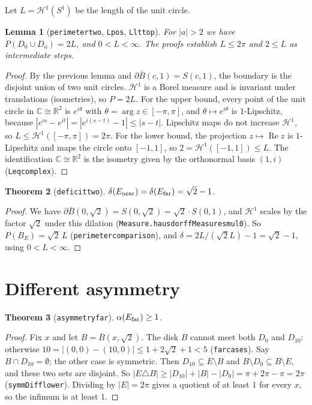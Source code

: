 \documentclass[11pt]{article}
\newtheorem{theorem}{Theorem}
\newtheorem{lemma}[theorem]{Lemma}
\theoremstyle{definition}
\theoremstyle{remark}
\renewcommand{\_}{\oldus\allowbreak}
\newcommand{\R}{\mathbb{R}}
\newcommand{\Hm}{\mathcal{H}^1}
\begin{document}
Let $L=\Hm(S^1)$ be the length of the unit circle.

\begin{lemma}[\texttt{perimeter\_two}, \texttt{L\_pos}, \texttt{L\_lt\_top}]
For $|a|>2$ we have $P(D_0\cup D_a)=2L$, and $0<L<\infty$. The proofs establish $L\le 2\pi$ and
$2\le L$ as intermediate steps.
\end{lemma}
\begin{proof}
By the previous lemma and $\partial \bar B(c,1)=S(c,1)$, the boundary is the disjoint union of two
unit circles. $\Hm$ is a Borel measure and is invariant under translations (isometries), so
$P=2L$. For the upper bound, every point of the unit circle in $\mathbb{C}\cong\R^2$ is
$e^{i\theta}$ with $\theta=\arg z\in[-\pi,\pi]$, and $\theta\mapsto e^{i\theta}$ is
$1$-Lipschitz, because $|e^{is}-e^{it}|=|e^{i(s-t)}-1|\le|s-t|$. Lipschitz maps do not increase
$\Hm$, so $L\le\Hm([-\pi,\pi])=2\pi$. For the lower bound, the projection $z\mapsto\operatorname{Re}z$
is $1$-Lipschitz and maps the circle onto $[-1,1]$, so $2=\Hm([-1,1])\le L$. The identification
$\mathbb{C}\cong\R^2$ is the isometry given by the orthonormal basis $(1,i)$
(\texttt{L\_eq\_complex}).
\end{proof}

\begin{theorem}[\texttt{deficit\_two}]
$\delta(E_{\rm near})=\delta(E_{\rm far})=\sqrt2-1$.
\end{theorem}
\begin{proof}
We have $\partial\bar B(0,\sqrt2)=S(0,\sqrt2)=\sqrt2\cdot S(0,1)$, and $\Hm$ scales by the factor
$\sqrt2$ under this dilation (\texttt{Measure.hausdorffMeasure\_smul0}). So
$P(B_E)=\sqrt2\,L$ (\texttt{perimeter\_comparison}), and
$\delta=2L/(\sqrt2 L)-1=\sqrt2-1$, using $0<L<\infty$.
\end{proof}

\section{Different asymmetry}

\begin{theorem}[\texttt{asymmetry\_far}]
$\alpha(E_{\rm far})\ge 1$.
\end{theorem}
\begin{proof}
Fix $x$ and let $B=\bar B(x,\sqrt2)$. The disk $B$ cannot meet both $D_0$ and $D_{10}$: otherwise
$10=|(0,0)-(10,0)|\le 1+2\sqrt2+1<5$ (\texttt{far\_cases}). Say $B\cap D_{10}=\emptyset$; the other
case is symmetric. Then $D_{10}\subseteq E\setminus B$ and $B\setminus D_0\subseteq B\setminus E$,
and these two sets are disjoint. So
$|E\triangle B|\ge |D_{10}|+|B|-|D_0|=\pi+2\pi-\pi=2\pi$ (\texttt{symmDiff\_lower}). Dividing by
$|E|=2\pi$ gives a quotient of at least $1$ for every $x$, so the infimum is at least $1$.
\end{proof}
\end{document}
